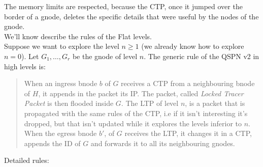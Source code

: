 \documentclass[a4paper]{article}
\begin{document}
The memory limits are respected, because the CTP, once it jumped
over the border of a gnode, deletes the specific details that were useful by the nodes of
the gnode.\\
\newline
We'll know describe the rules of the Flat levels.\\
Suppose we want to explore the level $n\ge 1$ (we already know how to
explore $n=0$). Let $G_1,\dots, G_r$ be the gnode of level $n$. The generic
rule of the QSPN v2 in high levels is: 
\begin{quote}
When an ingress bnode $b$ of $G$ receives a CTP from a neighbouring bnode of
$H$, it appends in the packet its IP. The packet, called
\emph{Locked Tracer Packet} is then flooded inside $G$.
The LTP of level $n$, is a packet that is propagated with the same rules of
the CTP, i.e if it isn't interesting it's dropped, but that isn't updated
while it explores the levels inferior to $n$. When the egress bnode $b'$,
of $G$ receives the LTP, it changes it in a CTP, appends the ID of $G$ and
forwards it to all its neighbouring gnodes.
\end{quote}
Detailed rules:
\end{document}
